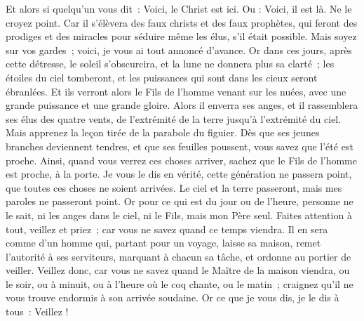 \begin{multicols}{2}
Et alors si quelqu'un vous dit~: Voici, le Christ est ici. Ou : Voici, il est là. Ne le croyez point.
Car il s'élèvera des faux christs et des faux prophètes, qui feront des prodiges et des miracles pour séduire même les élus, s'il était possible.
Mais soyez sur vos gardes~; voici, je vous ai tout annoncé d'avance.
Or dans ces jours, après cette détresse, le soleil s'obscurcira, et la lune ne donnera plus sa clarté~;
les étoiles du ciel tomberont, et les puissances qui sont dans les cieux seront ébranlées.
Et ils verront alors le Fils de l'homme venant sur les nuées, avec une grande puissance et une grande gloire.
Alors il enverra ses anges, et il rassemblera ses élus des quatre vents, de l'extrémité de la terre jusqu'à l'extrémité du ciel.
Mais apprenez la leçon tirée de la parabole du figuier. Dès que ses jeunes branches deviennent tendres, et que ses feuilles poussent, vous savez que l'été est proche.
Ainsi, quand vous verrez ces choses arriver, sachez que le Fils de l'homme est proche, à la porte.
Je vous le dis en vérité, cette génération ne passera point, que toutes ces choses ne soient arrivées.
Le ciel et la terre passeront, mais mes paroles ne passeront point.
Or pour ce qui est du jour ou de l'heure, personne ne le sait, ni les anges dans le ciel, ni le Fils, mais mon Père seul.
Faites attention à tout, veillez et priez~; car vous ne savez quand ce temps viendra.
Il en sera comme d'un homme qui, partant pour un voyage, laisse sa maison, remet l'autorité à ses serviteurs, marquant à chacun sa tâche, et ordonne au portier de veiller.
Veillez donc, car vous ne savez quand le Maître de la maison viendra, ou le soir, ou à minuit, ou à l'heure où le coq chante, ou le matin~;
craignez qu'il ne vous trouve endormis à son arrivée soudaine.
Or ce que je vous dis, je le dis à tous~: Veillez !

\end{multicols}
